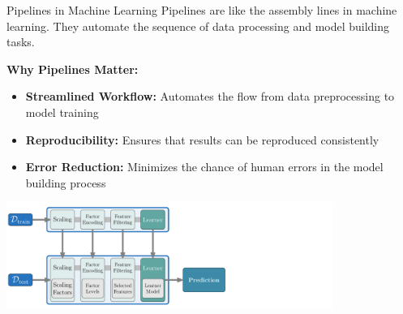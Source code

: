 \documentclass[11pt,compress,t,notes=noshow, xcolor=table]{beamer}
\begin{document}
\begin{vbframe}{Pipelines in Machine Learning}
Pipelines are like the assembly lines in machine learning. They automate the sequence of data processing and model building tasks.
\vspace{1em}

\textbf{Why Pipelines Matter:}
\begin{itemize}
\item \small \textbf{Streamlined Workflow:} Automates the flow from data preprocessing to model training
\item \small \textbf{Reproducibility:} Ensures that results can be reproduced consistently
\item \small \textbf{Error Reduction:} Minimizes the chance of human errors in the model building process
\end{itemize}

\begin{center}
\includegraphics[width = 0.8\textwidth]{figure_man/linear_pipeline-no_circle.png}
\end{center}

\end{vbframe}

\endlecture
\end{document}
